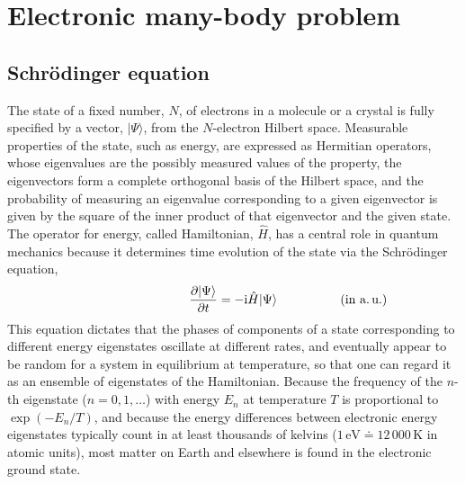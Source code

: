 \chapter{Electronic many-body problem}\label{chap:electrons}

\section{Schrödinger equation}

The state of a fixed number, $N$, of electrons in a molecule or a crystal is fully specified by a vector, $|\Psi\rangle$, from the $N$-electron Hilbert space.
Measurable properties of the state, such as energy, are expressed as Hermitian operators, whose eigenvalues are the possibly measured values of the property, the eigenvectors form a complete orthogonal basis of the Hilbert space, and the probability of measuring an eigenvalue corresponding to a given eigenvector is given by the square of the inner product of that eigenvector and the given state.
The operator for energy, called Hamiltonian, $\hat H$, has a central role in quantum mechanics because it determines time evolution of the state via the Schrödinger equation,
\begin{equation}
  \frac{\partial|\Psi\rangle}{\partial t}=-\mathrm i\hat H|\Psi\rangle
  \makebox[0pt]{\hspace{0.4\linewidth}(in a.\,u.)}
\end{equation}
This equation dictates that the phases of components of a state corresponding to different energy eigenstates oscillate at different rates, and eventually appear to be random for a system in equilibrium at temperature, so that one can regard it as an ensemble of eigenstates of the Hamiltonian.
Because the frequency of the $n$-th eigenstate ($n=0,1,\ldots$) with energy $E_n$ at temperature $T$ is proportional to $\exp(-E_n/T)$, and because the energy differences between electronic energy eigenstates typically count in at least thousands of kelvins ($1\,\mathrm{eV}\doteq12\,000\,\mathrm{K}$ in atomic units), most matter on Earth and elsewhere is found in the electronic ground state.

